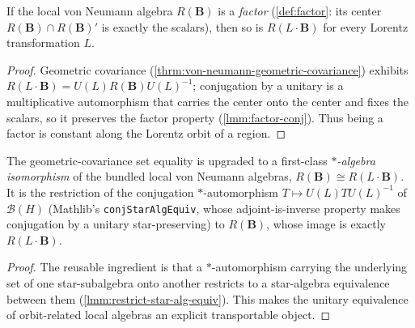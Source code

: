 \begin{theorem}
    \label{thrm:von-neumann-factor-orbit}
    \leanok
    If the local von Neumann algebra $R(\mathbf{B})$ is a \emph{factor} (\ref{def:factor}: its center $R(\mathbf{B}) \cap R(\mathbf{B})'$ is exactly the scalars), then so is $R(L \cdot \mathbf{B})$ for every Lorentz transformation $L$.
\end{theorem}
\begin{proof}
    \leanok
    Geometric covariance (\ref{thrm:von-neumann-geometric-covariance}) exhibits $R(L \cdot \mathbf{B}) = U(L) R(\mathbf{B}) U(L)^{-1}$; conjugation by a unitary is a multiplicative automorphism that carries the center onto the center and fixes the scalars, so it preserves the factor property (\ref{lmm:factor-conj}). Thus being a factor is constant along the Lorentz orbit of a region.
\end{proof}

\begin{theorem}
    \label{thrm:von-neumann-covariance-iso}
    \leanok
    The geometric-covariance set equality is upgraded to a first-class \emph{$*$-algebra isomorphism} of the bundled local von Neumann algebras, $R(\mathbf{B}) \cong R(L \cdot \mathbf{B})$. It is the restriction of the conjugation $*$-automorphism $T \mapsto U(L) T U(L)^{-1}$ of $\mathcal{B}(H)$ (Mathlib's \texttt{conjStarAlgEquiv}, whose adjoint-is-inverse property makes conjugation by a unitary star-preserving) to $R(\mathbf{B})$, whose image is exactly $R(L \cdot \mathbf{B})$.
\end{theorem}
\begin{proof}
    \leanok
    The reusable ingredient is that a $*$-automorphism carrying the underlying set of one star-subalgebra onto another restricts to a star-algebra equivalence between them (\ref{lmm:restrict-star-alg-equiv}). This makes the unitary equivalence of orbit-related local algebras an explicit transportable object.
\end{proof}

